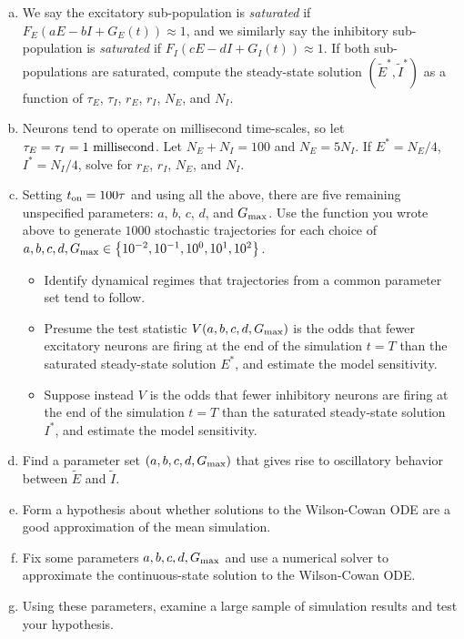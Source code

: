 \begin{exercises}
\begin{enumerate}[(a)]
\item We say the excitatory sub-population is \textit{saturated} if $F_E(aE - bI + G_E(t)) \approx 1$, and we similarly say the inhibitory sub-population is \textit{saturated} if $F_I(cE - dI + G_I(t)) \approx 1$. If both sub-populations are saturated, compute the steady-state solution $(\widetilde{E}^*, \widetilde{I}^*)$ as a function of $\tau_E$, $\tau_I$, $r_E$, $r_I$, $N_E$, and $N_I$.
\item Neurons tend to operate on millisecond time-scales, so let $\tau_E = \tau_I = 1\textup{ millisecond}$. Let $N_E + N_I = 100$ and $N_E = 5N_I$. If $E^* = N_E/4$, $I^* = N_I/4$, solve for $r_E$, $r_I$, $N_E$, and $N_I$.
\item Setting $t_{\textup{on}} = 100 \tau$ and using all the above, there are five remaining unspecified parameters: $a$, $b$, $c$, $d$, and $G_{\textup{max}}$. Use the function you wrote above to generate $1000$ stochastic trajectories for each choice of $a, b, c, d, G_{\textup{max}} \in \left\{10^{-2}, 10^{-1}, 10^0, 10^1, 10^2\right\}$.
\begin{itemize}
\item Identify dynamical regimes that trajectories from a common parameter set tend to follow.
\item Presume the test statistic $V(a, b, c, d, G_{\textup{max}})$ is the odds that fewer excitatory neurons are firing at the end of the simulation $t=T$ than the saturated steady-state solution $E^*$, and estimate the model sensitivity.
\item Suppose instead  $V$ is the odds that fewer inhibitory neurons are firing at the end of the simulation $t=T$ than the saturated steady-state solution $I^*$, and estimate the model sensitivity.
\end{itemize}
\item Find a parameter set $(a, b, c, d, G_{\textup{max}})$ that gives rise to oscillatory behavior between $\widetilde{E}$ and $\widetilde{I}$.
\item Form a hypothesis about whether solutions to the Wilson-Cowan ODE are a good approximation of the mean simulation.
\item Fix some parameters $a, b, c, d, G_{\textup{max}}$ and use a numerical solver to approximate the continuous-state solution to the Wilson-Cowan ODE.
\item Using these parameters, examine a large sample of simulation results and test your hypothesis.
\end{enumerate}

\end{exercises}